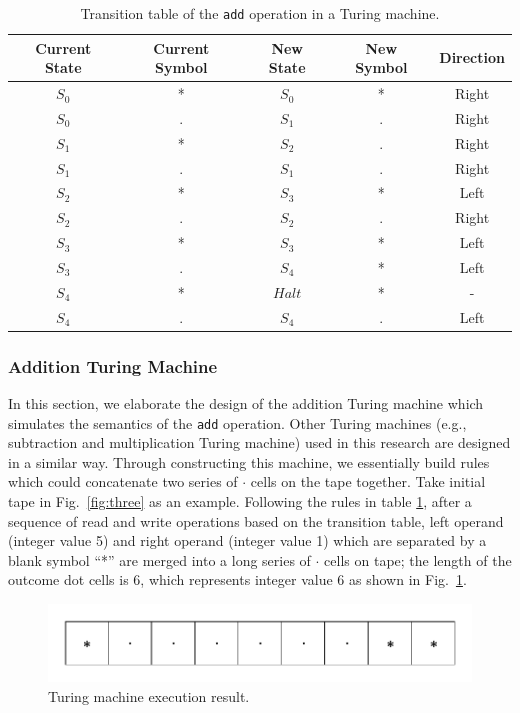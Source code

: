 \documentclass[lnicst]{svmultln}
\newcommand{\F}{Fig.}
\begin{document}
\begin{table}
\centering
\begin{tabular}{ |c|c|c|c|c|} 
  \hline
  \textbf{Current State} & \textbf{Current Symbol} & \textbf{New State} & \textbf{New Symbol} & \textbf{Direction} \\ 
  \hline
  \(S_0\) & * & \(S_0\) & * & Right\\ 
  \hline
  \(S_0\) & . &\(S_1\)  & . & Right\\
  \hline
  \(S_1\) & * &\(S_2\) & . & Right\\  
  \hline
  \(S_1\) & . & \(S_1\) & . & Right \\
  \hline
  \(S_2\) & * & \(S_3\) & * & Left \\
  \hline
  \(S_2\) & . & \(S_2\) & . & Right \\
  \hline
  \(S_3\) & * & \(S_3\) & * & Left \\
  \hline
  \(S_3\) & . & \(S_4\) & * & Left \\
  \hline
  \(S_4\) & * & \(Halt\) & * & - \\
  \hline
  \(S_4\) & . & \(S_4\) & . & Left\\
  \hline

\end{tabular}
\caption{Transition table of the \texttt{add} operation in a Turing machine.}
\label{table:1}
\end{table}

\subsubsection{Addition Turing Machine}
In this section, we elaborate the design of the addition Turing machine which
simulates the semantics of the \texttt{add} operation. Other Turing machines
(e.g., subtraction and multiplication Turing machine) used in this research are
designed in a similar way. Through constructing this machine, we essentially
build rules which could concatenate two series of  $\cdot$ cells on the tape
together. Take initial tape in \F~\ref{fig:three} as an example. Following the
rules in table \ref{table:1}, after a sequence of read and write operations
based on the transition table, left operand (integer value 5) and right operand
(integer value 1) which are separated by a blank symbol ``*'' are merged into a
long series of $\cdot$ cells on tape; the length of the outcome dot cells is 6,
which represents integer value 6 as shown in \F~\ref{fig:turing_outcome}.

\begin{figure}
 \includegraphics[width=0.9\linewidth]{Turingaddoutcome.pdf}
 \caption{Turing machine execution result.}
 \label{fig:turing_outcome}
\end{figure}
\end{document}

